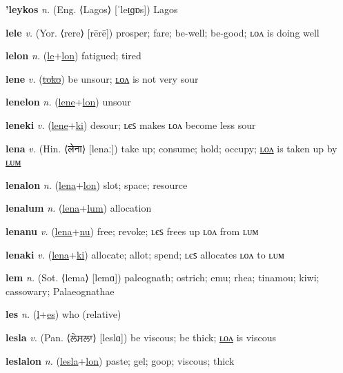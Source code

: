 \textbf{\hypertarget{'leykos}{'leykos}} \textit{n.} (Eng. ⟨Lagos⟩ [ˈleɪ̯ɡɒs])
Lagos

\textbf{\hypertarget{lele}{lele}} \textit{v.} (Yor. ⟨rere⟩ [rērē])
prosper; fare; be-well; be-good; ʟᴏᴧ is doing well

\textbf{\hypertarget{lelon}{lelon}} \textit{n.} (\hyperlink{le}{le}+\allowbreak \hyperlink{lon}{lon})
fatigued; tired

\textbf{\hypertarget{lene}{lene}} \textit{v.} (\hyperlink{toko}{\sout{toko}})
be unsour; \hyperlink{lenelon}{ʟᴏᴧ} is not very sour

\textbf{\hypertarget{lenelon}{lenelon}} \textit{n.} (\hyperlink{lene}{lene}+\allowbreak \hyperlink{lon}{lon})
unsour

\textbf{\hypertarget{leneki}{leneki}} \textit{v.} (\hyperlink{lene}{lene}+\allowbreak \hyperlink{ki}{ki})
desour; ʟєꜱ makes ʟᴏᴧ become less sour

\textbf{\hypertarget{lena}{lena}} \textit{v.} (Hin. ⟨{\devanagari{}लेना}⟩ [lenaː])
take up; consume; hold; occupy; \hyperlink{lenalon}{ʟᴏᴧ} is taken up by \hyperlink{lenalum}{ʟᴜᴍ}

\textbf{\hypertarget{lenalon}{lenalon}} \textit{n.} (\hyperlink{lena}{lena}+\allowbreak \hyperlink{lon}{lon})
slot; space; resource

\textbf{\hypertarget{lenalum}{lenalum}} \textit{n.} (\hyperlink{lena}{lena}+\allowbreak \hyperlink{lum}{lum})
allocation

\textbf{\hypertarget{lenanu}{lenanu}} \textit{v.} (\hyperlink{lena}{lena}+\allowbreak \hyperlink{nu}{nu})
free; revoke; ʟєꜱ frees up ʟᴏᴧ from ʟᴜᴍ

\textbf{\hypertarget{lenaki}{lenaki}} \textit{v.} (\hyperlink{lena}{lena}+\allowbreak \hyperlink{ki}{ki})
allocate; allot; spend; ʟєꜱ allocates ʟᴏᴧ to ʟᴜᴍ

\textbf{\hypertarget{lem}{lem}} \textit{n.} (Sot. ⟨lema⟩ [lemɑ])
paleognath; ostrich; emu; rhea; tinamou; kiwi; cassowary; Palaeognathae

\textbf{\hypertarget{les}{les}} \textit{n.} (\hyperlink{l}{l}+\allowbreak \hyperlink{es}{es})
who (relative)

\textbf{\hypertarget{lesla}{lesla}} \textit{v.} (Pan. ⟨{\gurmukhi{}ਲੇਸਲਾ}⟩ [leslɑ])
be viscous; be thick; \hyperlink{leslalon}{ʟᴏᴧ} is viscous

\textbf{\hypertarget{leslalon}{leslalon}} \textit{n.} (\hyperlink{lesla}{lesla}+\allowbreak \hyperlink{lon}{lon})
paste; gel; goop; viscous; thick


